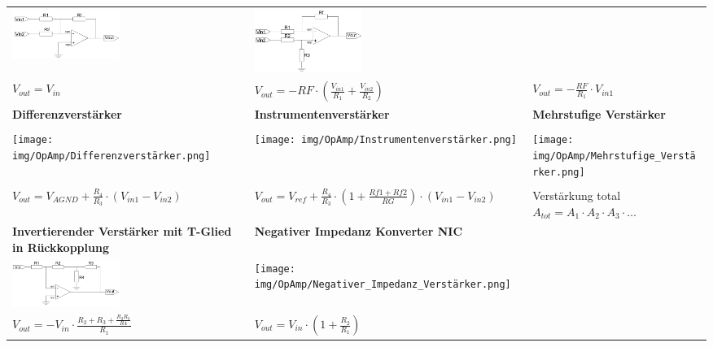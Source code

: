 \documentclass[margin=normal]{tex/hsrzf}
\begin{document}
\begin{tabularx}{0.8\textwidth}{p{155pt}p{155pt}p{155pt}}
    \includegraphics[width = 3.5cm]{img/OpAmp/Invertierender_Addierer.png}                            &
    \includegraphics[width = 3.5cm]{img/OpAmp/Gewichteter_Subtrahierer.png}                             \\
    $ V_{out} = V_{in}$                                                                               &
    $ V_{out} = - RF \cdot (\frac{V_{in1}}{R_1} + \frac{V_{in2}}{R_2}) $                              &
    $ V_{out} =-\frac{RF}{R_1} \cdot V_{in1} $                                                          \\
    \textbf{Differenzverstärker}                                                                      &
    \textbf{Instrumentenverstärker}                                                                   &
    \textbf{Mehrstufige Verstärker}                                                                     \\
    \\
    \texttt{[image: img/OpAmp/Differenzverstärker.png]}                                &
    \texttt{[image: img/OpAmp/Instrumentenverstärker.png]}                             &
    \texttt{[image: img/OpAmp/Mehrstufige\_Verstärker.png]}                               \\
    \\
    $ V_{out} = V_{AGND} + \frac{R_4}{R_3} \cdot(V_{in1} - V_{in2}) $                                 &
    $ V_{out} = V_{ref} + \frac{R_4}{R_3} \cdot (1 + \frac{Rf1 + Rf2}{RG}) \cdot (V_{in1} - V_{in2})$ &
    Verstärkung total $ A_{tot} = A_1 \cdot A_2 \cdot A_3\cdot\dots$                                    \\
    \textbf{Invertierender Verstärker \newline
    mit T-Glied in Rückkopplung}                                                                      &
    \textbf{Negativer Impedanz Konverter NIC}                                                         &
    \\
    \includegraphics[width = 3.5cm]{img/OpAmp/Invertierender_Verstärker_mit_T-Glied_Rückkopplung.png} &
    \texttt{[image: img/OpAmp/Negativer\_Impedanz\_Verstärker.png]}                      &
    \\
    $ V_{out} = - V_{in} \cdot \frac{R_2 + R_3 + \frac{R_2R_3}{R4}}{R_1} $                            &
    $ V_{out} = V_{in} \cdot (1+ \frac{R_2}{R_1})$                                                    &
    \\
  \end{tabularx}
\end{document}
